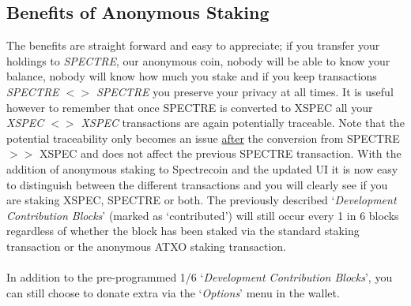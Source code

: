 \subsection{Benefits of Anonymous Staking}
The benefits are straight forward and easy to appreciate; if you transfer
your holdings to \textit{SPECTRE}, our anonymous coin, nobody will be able
to know your balance, nobody will know how much you stake and if you keep
transactions \textit{SPECTRE $<>$ SPECTRE} you preserve your privacy at all
times. It is useful however to remember that once SPECTRE is converted to
XSPEC all your \textit{XSPEC $<>$ XSPEC} transactions are again potentially
traceable. Note that the potential traceability only becomes an issue
\underline{after} the conversion from SPECTRE $>>$ XSPEC and does not affect
the previous SPECTRE transaction.
\newpage
\noindent
With the addition of anonymous staking to Spectrecoin and the updated UI it
is now easy to distinguish between the different transactions and you will
clearly see if you are staking XSPEC, SPECTRE or both. The previously
described ‘\textit{Development Contribution Blocks}’ (marked as ‘contributed’)
will still occur every 1 in 6 blocks regardless of whether the block has
been staked via the standard staking transaction or the anonymous ATXO
staking transaction.
\\
\\
\noindent
In addition to the pre-programmed 1/6 ‘\textit{Development Contribution Blocks}’,
you can still choose to donate extra via the ‘\textit{Options}’ menu in the wallet.



